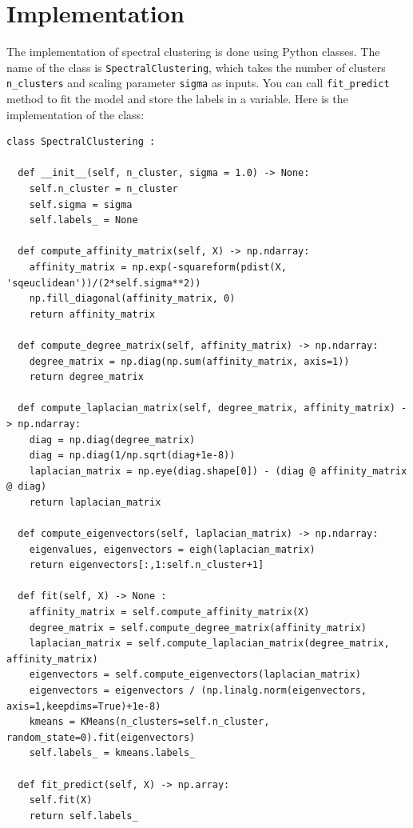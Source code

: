 \documentclass{article}
\begin{document}
\section{Implementation}
\label{sec:implementation}
The implementation of spectral clustering is done using Python classes. The name of the class is \texttt{SpectralClustering}, which takes the number of clusters \texttt{n\_clusters} and scaling parameter \texttt{sigma} as inputs. You can call \texttt{fit\_predict} method to fit the model and store the labels in a variable. Here is the implementation of the class:

\begin{lstlisting}[caption={Spectral Clustering Implementation}, label={code:spectral}]
class SpectralClustering :

  def __init__(self, n_cluster, sigma = 1.0) -> None:
    self.n_cluster = n_cluster
    self.sigma = sigma
    self.labels_ = None

  def compute_affinity_matrix(self, X) -> np.ndarray:
    affinity_matrix = np.exp(-squareform(pdist(X, 'sqeuclidean'))/(2*self.sigma**2))
    np.fill_diagonal(affinity_matrix, 0)
    return affinity_matrix

  def compute_degree_matrix(self, affinity_matrix) -> np.ndarray:
    degree_matrix = np.diag(np.sum(affinity_matrix, axis=1))
    return degree_matrix

  def compute_laplacian_matrix(self, degree_matrix, affinity_matrix) -> np.ndarray:
    diag = np.diag(degree_matrix)
    diag = np.diag(1/np.sqrt(diag+1e-8))
    laplacian_matrix = np.eye(diag.shape[0]) - (diag @ affinity_matrix @ diag)
    return laplacian_matrix

  def compute_eigenvectors(self, laplacian_matrix) -> np.ndarray:
    eigenvalues, eigenvectors = eigh(laplacian_matrix)
    return eigenvectors[:,1:self.n_cluster+1]

  def fit(self, X) -> None :
    affinity_matrix = self.compute_affinity_matrix(X)
    degree_matrix = self.compute_degree_matrix(affinity_matrix)
    laplacian_matrix = self.compute_laplacian_matrix(degree_matrix, affinity_matrix)
    eigenvectors = self.compute_eigenvectors(laplacian_matrix)
    eigenvectors = eigenvectors / (np.linalg.norm(eigenvectors, axis=1,keepdims=True)+1e-8)
    kmeans = KMeans(n_clusters=self.n_cluster, random_state=0).fit(eigenvectors)
    self.labels_ = kmeans.labels_

  def fit_predict(self, X) -> np.array:
    self.fit(X)
    return self.labels_
\end{lstlisting}
\end{document}
